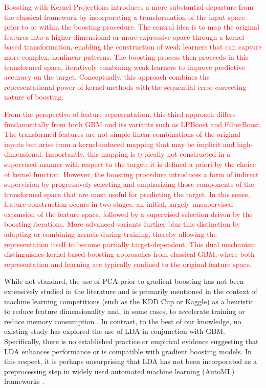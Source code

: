 \documentclass[11pt,a4paper]{article}
\providecommand{\DIFaddtex}[1]{\textcolor{red}{#1}}
\providecommand{\DIFaddend}{}
\providecommand{\DIFadd}[1]{\texorpdfstring{\DIFaddtex{#1}}{#1}}
\begin{document}
\DIFadd{Boosting with Kernel Projections \citep{kegl2009kernelboost} introduces a more substantial departure from the classical framework by incorporating a transformation of the input space prior to or within the boosting procedure. The central idea is to map the original features into a higher-dimensional or more expressive space through a kernel-based transformation, enabling the construction of weak learners that can capture more complex, nonlinear patterns. The boosting process then proceeds in this transformed space, iteratively combining weak learners to improve predictive accuracy on the target. Conceptually, this approach combines the representational power of kernel methods with the sequential error-correcting nature of boosting.}

\DIFadd{From the perspective of feature representation, this third approach differs fundamentally from both GBM and its variants such as LPBoost and FilterBoost. The transformed features are not simple linear combinations of the original inputs but arise from a kernel-induced mapping that may be implicit and high-dimensional. Importantly, this mapping is typically not constructed in a supervised manner with respect to the target; it is defined a priori by the choice of kernel function. However, the boosting procedure introduces a form of indirect supervision by progressively selecting and emphasizing those components of the transformed space that are most useful for predicting the target. In this sense, feature construction occurs in two stages: an initial, largely unsupervised expansion of the feature space, followed by a supervised selection driven by the boosting iterations. More advanced variants further blur this distinction by adapting or combining kernels during training, thereby allowing the representation itself to become partially target-dependent. This dual mechanism distinguishes kernel-based boosting approaches from classical GBM, where both representation and learning are typically confined to the original feature space.}
\DIFaddend

While not standard, the use of PCA prior to gradient boosting has not been extensively studied in the literature and is primarily mentioned in the context of machine learning competitions (such as the KDD Cup or Kaggle) as a heuristic to reduce feature dimensionality and, in some cases, to accelerate training or reduce memory consumption \citep{rakhshan2020tensorized}.
In contrast, to the best of our knowledge, no existing study has explored the use of LDA in conjunction with GBM. Specifically, there is no established practice or empirical evidence suggesting that LDA enhances performance or is compatible with gradient boosting models. In this respect, it is perhaps unsurprising that LDA has not been incorporated as a preprocessing step in widely used automated machine learning (AutoML) frameworks \citep{NIPS2015_11d0e628}.
\end{document}
